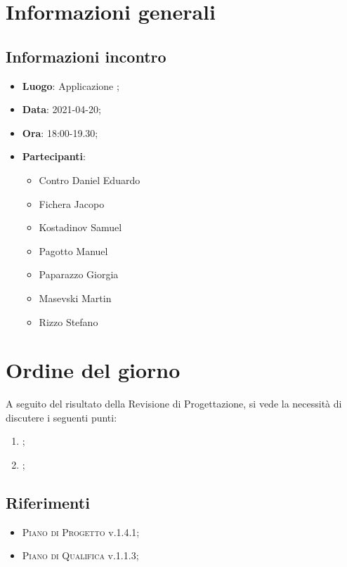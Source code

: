 \documentclass{article}
\begin{document}


\section{Informazioni generali}
\label{sec:info_generali}

\subsection{Informazioni incontro}
\label{sub:info_incontro}

\begin{itemize}
	\item \textbf{Luogo}: Applicazione ;
	\item \textbf{Data}: 2021-04-20;
	\item \textbf{Ora}: 18:00-19.30;
	\item \textbf{Partecipanti}:
	\begin{itemize}
		\item Contro Daniel Eduardo
		\item Fichera Jacopo
		\item Kostadinov Samuel
		\item Pagotto Manuel
		\item Paparazzo Giorgia
		\item Masevski Martin
		\item Rizzo Stefano
	\end{itemize}
\end{itemize}

\section{Ordine del giorno}%
\label{sec:ordine_del_giorno}
A seguito del risultato della Revisione di Progettazione, si vede la necessità di discutere i seguenti punti:
\begin{enumerate}
	\item {};
	\item {};
\end{enumerate}


\subsection{Riferimenti}%
\label{sub:riferimenti}
\begin{itemize}
    \item \textsc{Piano di Progetto} v.1.4.1;
    \item \textsc{Piano di Qualifica} v.1.1.3;

    \end{itemize}
\end{document}
